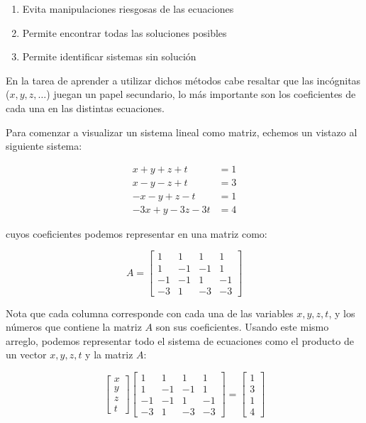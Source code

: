 \documentclass[
]{book}
\providecommand{\tightlist}{%
  \setlength{\itemsep}{0pt}\setlength{\parskip}{0pt}}
\begin{document}
\begin{enumerate}
\def\labelenumi{\arabic{enumi}.}
\tightlist
\item
  Evita manipulaciones riesgosas de las ecuaciones
\item
  Permite encontrar todas las soluciones posibles
\item
  Permite identificar sistemas sin solución
\end{enumerate}

En la tarea de aprender a utilizar dichos métodos cabe resaltar que las incógnitas (\(x, y, z, \dots\)) juegan un papel secundario, lo más importante son los coeficientes de cada una en las distintas ecuaciones.

Para comenzar a visualizar un sistema lineal como matriz, echemos un vistazo al siguiente sistema:

\begin{align}
x+y+z+t & = 1 \\
x-y-z+t & = 3 \\
-x-y+z-t & = 1\\
-3x+y-3z-3t &= 4
\end{align}

cuyos coeficientes podemos representar en una matriz como:

\[A = \left[
\begin{array}{rrrr}
1 & 1 & 1 & 1 \\
1 &-1 &-1 & 1 \\
-1&-1 & 1 &-1 \\
-3& 1 &-3 &-3
\end{array}
\right]\]

Nota que cada columna corresponde con cada una de las variables \(x, y, z, t\), y los números que contiene la matriz \(A\) son sus coeficientes. Usando este mismo arreglo, podemos representar todo el sistema de ecuaciones como el producto de un vector \(x, y, z, t\) y la matriz \(A\):

\begin{equation}
\left[
\begin{array} {r}
x \\ y \\ z \\ t
\end{array}
\right]
\left[
\begin{array}{rrrr}
1 & 1 & 1 & 1 \\
1 &-1 &-1 & 1 \\
-1&-1 & 1 &-1 \\
-3& 1 &-3 &-3
\end{array} 
\right] = 
\left[\begin{array}{r}
1 \\ 3 \\ 1 \\ 4
\end{array}\right] \label{eq:sist-matriz}
\end{equation}
\end{document}
